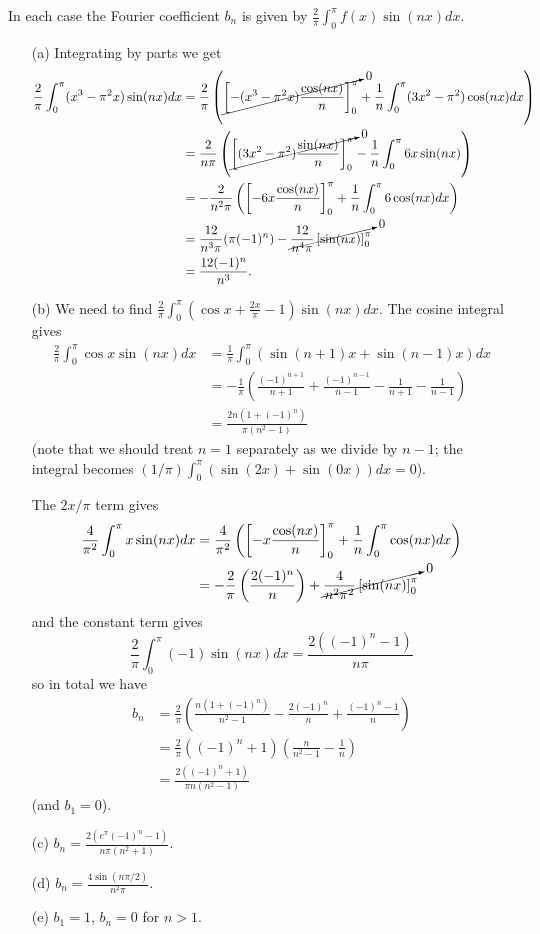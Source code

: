 \documentclass[12pt]{article}
\begin{document}
\begin{answer}
In each case the Fourier coefficient $b_n$ is given by $\frac{2}{\pi}\int_0^{\pi}f(x)\sin(nx)dx$.
\begin{enumerate}
\item[(a)] Integrating by parts we get
\begin{align*}
\frac{2}{\pi}\int_0^{\pi}(x^3-\pi^2x)\sin(nx)dx&=\frac{2}{\pi}\left(\cancelto{0}{\left[-(x^3-\pi^2x)\frac{\cos(nx)}{n}\right]_0^{\pi}}+\frac{1}{n}\int_0^{\pi}(3x^2-\pi^2)\cos(nx)dx\right)\\
&=\frac{2}{n\pi}\left(\cancelto{0}{\left[(3x^2-\pi^2)\frac{\sin(nx)}{n}\right]_0^{\pi}}-\frac{1}{n}\int_0^{\pi}6x\sin(nx)\right)\\
&=-\frac{2}{n^2\pi}\left(\left[-6x\frac{\cos(nx)}{n}\right]_0^{\pi}+\frac{1}{n}\int_0^{\pi}6\cos(nx)dx\right)\\
&=\frac{12}{n^3\pi}(\pi(-1)^{n})-\cancelto{0}{\frac{12}{n^4\pi}\left[\sin(nx)\right]_0^{\pi}}\\
&=\frac{12(-1)^{n}}{n^3}.
\end{align*}
\item[(b)] We need to find $\frac{2}{\pi}\int_0^{\pi}\left(\cos x+\frac{2x}{\pi}-1\right)\sin(nx)dx$. The cosine integral gives
\begin{align*}
\frac{2}{\pi}\int_0^{\pi}\cos x\sin(nx)dx&=\frac{1}{\pi}\int_0^{\pi}\left(\sin(n+1)x+\sin(n-1)x\right)dx\\
&=-\frac{1}{\pi}\left(\frac{(-1)^{n+1}}{n+1}+\frac{(-1)^{n-1}}{n-1}-\frac{1}{n+1}-\frac{1}{n-1}\right)\\
&=\frac{2n(1+(-1)^n)}{\pi(n^2-1)}
\end{align*}
(note that we should treat $n=1$ separately as we divide by $n-1$; the integral becomes $(1/\pi)\int_0^{\pi}(\sin(2x)+\sin(0x))dx=0$).

The $2x/\pi$ term gives
\begin{align*}
\frac{4}{\pi^2}\int_0^{\pi}x\sin(nx)dx&=\frac{4}{\pi^2}\left(\left[-x\frac{\cos(nx)}{n}\right]_0^{\pi}+\frac{1}{n}\int_0^{\pi}\cos(nx)dx\right)\\
&=-\frac{2}{\pi}\left(\frac{2(-1)^n}{n}\right)+\cancelto{0}{\frac{4}{n^2\pi^2}\left[\sin(nx)\right]_0^{\pi}}
\end{align*}
and the constant term gives
\[\frac{2}{\pi}\int_0^{\pi}(-1)\sin(nx)dx=\frac{2((-1)^n-1)}{n\pi}\]
so in total we have
\begin{align*}
b_n&=\frac{2}{\pi}\left(\frac{n(1+(-1)^n)}{n^2-1}-\frac{2(-1)^n}{n}+\frac{(-1)^n-1}{n}\right)\\
   &=\frac{2}{\pi}((-1)^n+1)\left(\frac{n}{n^2-1}-\frac{1}{n}\right)\\
   &=\frac{2((-1)^n+1)}{\pi n(n^2-1)}
\end{align*}
(and $b_1=0$).
\item[(c)] $b_n=\frac{2(e^{\pi}(-1)^n-1)}{n\pi(n^2+1)}$.
\item[(d)] $b_n=\frac{4\sin(n\pi/2)}{n^2\pi}$.
\item[(e)] $b_1=1$, $b_n=0$ for $n>1$.
\end{enumerate}
\end{answer}
\newpage
\end{document}
